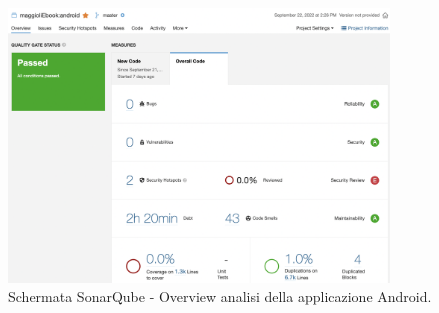 \begin{figure}[H]
\centering
    \includegraphics[width=0.9\textwidth]{img/Screenshot 2022-09-28 at 16.22.16.png}
    \caption{Schermata SonarQube - Overview analisi della applicazione Android.}
    \label{analisipipeline}
\end{figure}